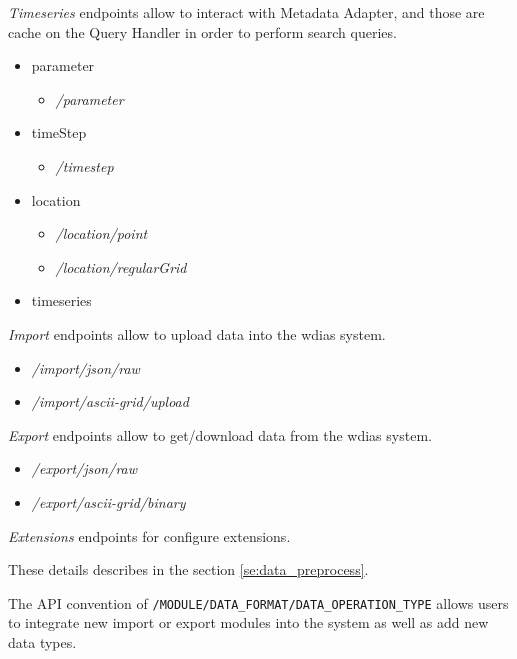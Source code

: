 \emph{Timeseries} endpoints allow to interact with Metadata Adapter, and those are cache on the Query Handler in order to perform search queries.
\begin{itemize}
    \item parameter
    \begin{itemize}
        \item \emph{/parameter}
    \end{itemize}
    \item timeStep
    \begin{itemize}
        \item \emph{/timestep}
    \end{itemize}
    \item location
    \begin{itemize}
        \item \emph{/location/point}
        \item \emph{/location/regularGrid}
    \end{itemize}
    \item timeseries
\end{itemize}

\emph{Import} endpoints allow to upload data into the \acrshort{wdias} system.
\begin{itemize}
    \item \emph{/import/json/raw}
    \item \emph{/import/ascii-grid/upload}
\end{itemize}

\emph{Export} endpoints allow to get/download data from the \acrshort{wdias} system.
\begin{itemize}
    \item \emph{/export/json/raw}
    \item \emph{/export/ascii-grid/binary}
\end{itemize}

\emph{Extensions} endpoints for configure extensions.

These details describes in the section \ref{se:data_preprocess}.

The API convention of \texttt{/MODULE/DATA\_FORMAT/DATA\_OPERATION\_TYPE} allows users to integrate new import or export modules into the system as well as add new data types.
